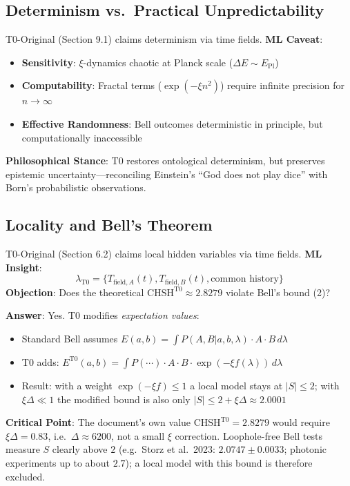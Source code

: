 	\subsection{Determinism vs.~Practical Unpredictability}
	
	T0-Original (Section 9.1) claims determinism via time fields. \textbf{ML Caveat}:
	\begin{itemize}
		\item \textbf{Sensitivity}: $\xi$-dynamics chaotic at Planck scale ($\Delta E \sim E_{\text{Pl}}$)
		\item \textbf{Computability}: Fractal terms ($\exp(-\xi n^2)$) require infinite precision for $n\to\infty$
		\item \textbf{Effective Randomness}: Bell outcomes deterministic in principle, but computationally inaccessible
	\end{itemize}
	\textbf{Philosophical Stance}: T0 restores ontological determinism, but preserves epistemic uncertainty---reconciling Einstein's ``God does not play dice'' with Born's probabilistic observations.
	
	
	\subsection{Locality and Bell's Theorem}
	
	T0-Original (Section 6.2) claims local hidden variables via time fields. \textbf{ML Insight}:
	\begin{equation}
		\lambda_{\text{T0}} = \{T_{\text{field},A}(t), T_{\text{field},B}(t), \text{common history}\} \tag{ML-Eq.~7.1}
	\end{equation}
	\textbf{Objection}: Does the theoretical $\text{CHSH}^{\text{T0}}\approx2.8279$ violate Bell's bound (2)?
	
	\textbf{Answer}: Yes. T0 modifies \textit{expectation values}:
	\begin{itemize}
		\item Standard Bell assumes $E(a,b) = \int P(A,B|a,b,\lambda) \cdot A \cdot B \, d\lambda$
		\item T0 adds: $E^{\text{T0}}(a,b) = \int P(\cdots) \cdot A \cdot B \cdot \exp(-\xi f(\lambda)) \, d\lambda$
		\item Result: with a weight $\exp(-\xi f) \leq 1$ a local model stays at $|S| \leq 2$; with $\xi\Delta \ll 1$ the modified bound is also only $|S| \leq 2 + \xi\Delta \approx 2.0001$
	\end{itemize}
	\textbf{Critical Point}: The document's own value $\text{CHSH}^{\text{T0}} = 2.8279$ would require $\xi\Delta = 0.83$, i.e.\ $\Delta \approx 6200$, not a small $\xi$ correction. Loophole-free Bell tests measure $S$ clearly above $2$ (e.g.\ Storz et al.\ 2023: $2.0747 \pm 0.0033$; photonic experiments up to about $2.7$); a local model with this bound is therefore excluded.
	
